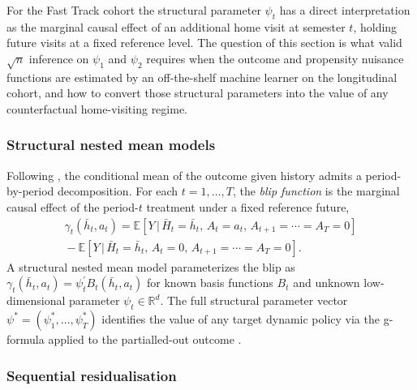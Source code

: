 For the Fast Track cohort the structural parameter $\psi_t$ has a direct interpretation as the marginal causal effect of an additional home visit at semester $t$, holding future visits at a fixed reference level. The question of this section is what valid $\sqrt n$ inference on $\psi_1$ and $\psi_2$ requires when the outcome and propensity nuisance functions are estimated by an off-the-shelf machine learner on the longitudinal cohort, and how to convert those structural parameters into the value of any counterfactual home-visiting regime.

\subsubsection*{Structural nested mean models}

Following \citet{robins1986, robins2004snmm, schulte2014qlearning}, the conditional mean of the outcome given history admits a period-by-period decomposition. For each $t = 1, \ldots, T$, the \emph{blip function} is the marginal causal effect of the period-$t$ treatment under a fixed reference future,
\begin{multline}
\gamma_t(\bar h_t, a_t) = \mathbb{E}\!\left[Y \,\big|\, \bar H_t = \bar h_t,\, A_t = a_t,\, A_{t+1} = \cdots = A_T = 0\right] \\
{}- \mathbb{E}\!\left[Y \,\big|\, \bar H_t = \bar h_t,\, A_t = 0,\, A_{t+1} = \cdots = A_T = 0\right].
\label{eq:blip_definition}
\end{multline}
A structural nested mean model parameterizes the blip as $\gamma_t(\bar h_t, a_t) = \psi_t^{\prime} B_t(\bar h_t, a_t)$ for known basis functions $B_t$ and unknown low-dimensional parameter $\psi_t \in \mathbb{R}^d$. The full structural parameter vector $\psi^* = (\psi_1^*, \ldots, \psi_T^*)$ identifies the value of any target dynamic policy via the g-formula applied to the partialled-out outcome \citep{robins2004snmm}.

\subsubsection*{Sequential residualisation}

